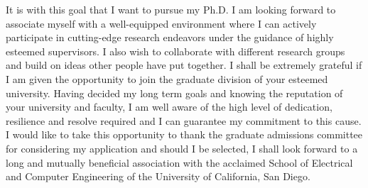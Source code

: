 \documentclass{article}
\begin{document}
	It is with this goal that I want to pursue my Ph.D. I am looking forward to associate myself with a well-equipped environment where I can actively participate in cutting-edge research endeavors under the guidance of highly esteemed supervisors. I also wish to collaborate with different research groups and 	build on ideas other people have put together.  I shall be extremely grateful if I am given the opportunity to join the graduate division of your esteemed university. Having decided my long term goals and knowing the reputation of your university and faculty, I am well aware of the high level of dedication, resilience and resolve required and I can guarantee my commitment to this cause. I would like to take this opportunity to thank the graduate admissions committee for considering my application and should I be selected, I shall look forward to a long and mutually	beneficial association with the acclaimed School of Electrical and Computer Engineering of the University of California, San Diego.
	
	
	
	
\end{document}
